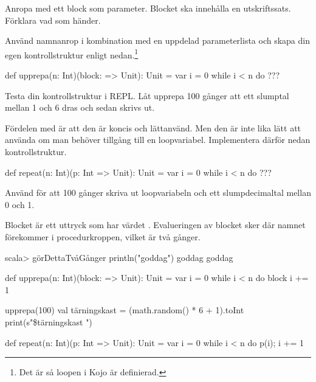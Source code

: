 \Subtask Anropa  med ett block som parameter. Blocket ska innehålla en utskriftssats. Förklara vad som händer.

\Subtask Använd namnanrop i kombination med en uppdelad parameterlista och skapa din egen kontrollstruktur enligt nedan.\footnote{Det är så loopen  i Kojo är definierad.}
\begin{Code}
def upprepa(n: Int)(block: => Unit): Unit =
  var i = 0
  while i < n do 
    ???
\end{Code}

\Subtask
Testa din kontrollstruktur i REPL. Låt upprepa 100 gånger att ett slumptal mellan 1 och 6 dras och sedan skrivs ut.

\Subtask Fördelen med  är att den är koncis och lättanvänd. Men den är inte lika lätt att använda om man behöver tillgång till en loopvariabel. Implementera därför nedan kontrollstruktur.

\begin{Code}
def repeat(n: Int)(p: Int => Unit): Unit = 
  var i = 0
  while i < n do
    ??? 
\end{Code}

\Subtask Använd  för att 100 gånger skriva ut loopvariabeln och ett slumpdecimaltal mellan 0 och 1.


\SOLUTION

\TaskSolved \what

\SubtaskSolved Blocket är ett uttryck som har värdet . Evalueringen av blocket sker där namnet  förekommer i procedurkroppen, vilket är två gånger.
\begin{REPL}
scala> görDettaTvåGånger { println("goddag") }
goddag
goddag
\end{REPL}

\SubtaskSolved
\begin{Code}
def upprepa(n: Int)(block: => Unit): Unit =
  var i = 0
  while i < n do
    block
    i += 1
\end{Code}

\SubtaskSolved
\begin{Code}
upprepa(100) {
  val tärningskast = (math.random() * 6 + 1).toInt
  print(s"\$tärningskast ")
}
\end{Code}


\SubtaskSolved
\begin{Code}
def repeat(n: Int)(p: Int => Unit): Unit = {
  var i = 0
  while i < n do
    p(i); i += 1
}
\end{Code}

